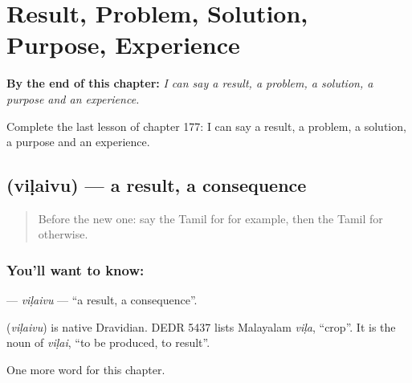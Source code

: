 
\chapter{Result, Problem, Solution, Purpose, Experience}
\label{ch:ta-result-problem-solution-purpose-experience}

\begin{chapteropening}
\textbf{By the end of this chapter:} \emph{I can say a result, a problem, a solution, a purpose and an experience.}

Complete the last lesson of chapter 177: I can say a result, a problem, a solution, a purpose and an experience.
\end{chapteropening}

\section[\texorpdfstring{\ta{விளைவு} (viḷaivu)}{விளைவு (viḷaivu)}]{ (viḷaivu) — a result, a consequence}

\label{lesson:TA-C177-vilaivu}



\begin{quote}
Before the new one: say the Tamil for for example, then the Tamil for otherwise.
\end{quote}

\subsection*{You'll want to know: }
\textbf{} — \emph{viḷaivu} — \textquotedblleft{}a result, a consequence\textquotedblright{}.

\begin{cousinweb}
\textbf{} (\emph{viḷaivu}) is native Dravidian. DEDR 5437 lists Malayalam \emph{viḷa}, \textquotedblleft{}crop\textquotedblright{}. It is the noun of \emph{viḷai}, \textquotedblleft{}to be produced, to result\textquotedblright{}.
\end{cousinweb}

\begin{grammarlens}[title={What you've built}]
One more word for this chapter.
\end{grammarlens}


